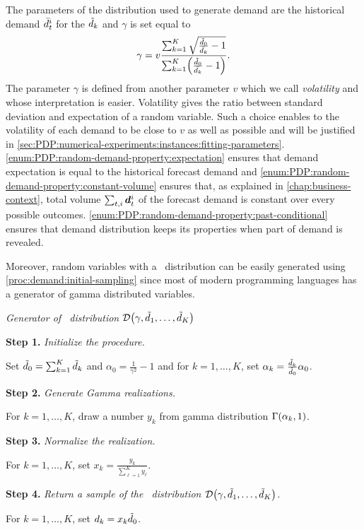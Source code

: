 The parameters of the \distrib distribution used to generate demand are the historical demand $\bar{d}_t^i$ for the $\tilde{d}_k$ and $\gamma$ is set equal to
\begin{equation}
  \gamma
  =
  v\frac
  {\sum_{k=1}^K\sqrt{\frac{\tilde{\demand}_0}{\bar{\demand_k}}-1}}
  {\sum_{k=1}^K\bracket{\frac{\tilde{\demand}_0}{\bar{\demand_k}}-1}}.
\end{equation}
The parameter $\gamma$ is defined from another parameter $v$ which we call \emph{volatility} and whose interpretation is easier.
Volatility gives the ratio between standard deviation and expectation of a random variable.
Such a choice enables to the volatility of each demand to be close to $v$ as well as possible and will be justified in \cref{sec:PDP:numerical-experiments:instances:fitting-parameters}.
\cref{enum:PDP:random-demand-property:expectation} ensures that demand expectation is equal to the historical forecast demand and \cref{enum:PDP:random-demand-property:constant-volume} ensures that, as explained in \cref{chap:business-context}, total volume $\sum_{t,i}\va\demand_t^i$ of the forecast demand is constant over every possible outcomes.
\cref{enum:PDP:random-demand-property:past-conditional} ensures that demand distribution keeps its properties when part of demand is revealed.


Moreover, random variables with a \distrib\ distribution can be easily generated using \cref{proc:demand:initial-sampling} since most of modern programming languages has a generator of gamma distributed variables.


\begin{proc}\label{proc:demand:initial-sampling}
\emph{Generator of \distrib\ distribution $\cD\bracket{\gamma,\tilde{\demand}_1,\ldots,\tilde{\demand}_K}$}

\textbf{Step 1.} \emph{Initialize the procedure.}

Set $\tilde{d}_0 = \sum_{k=1}^K\tilde{d}_k$ and $\alpha_0 = \frac{1}{\gamma^2}-1$ and for $k=1,\ldots,K$, set $\alpha_k=\frac{\tilde{d}_k}{\tilde{d}_0}\alpha_0$.

\textbf{Step 2.} \emph{Generate Gamma realizations.}

For $k=1,\ldots,K$, draw a number $y_k$ from gamma distribution $\Gamma\bracket{\alpha_k,1}$.

\textbf{Step 3.} \emph{Normalize the realization.}

For $k=1,\ldots,K$, set $x_k=\frac{y_k}{\sum_{\ell=1}^K y_{\ell}}$.

\textbf{Step 4.} \emph{Return a sample of the \distrib\ distribution $\cD\bracket{\gamma,\tilde{\demand}_1,\ldots,\tilde{\demand}_K}$.}

For $k=1,\ldots,K$, set $d_k = x_k \tilde{d}_0$.
\end{proc}


